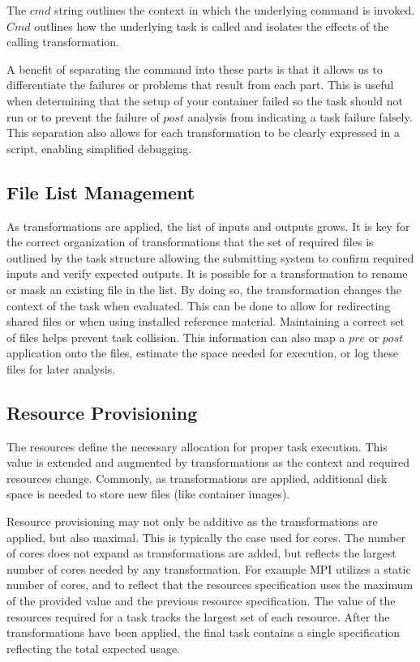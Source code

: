 \documentclass[conference]{IEEEtran}
\begin{document}
The ${cmd}$ string outlines the context in which
the underlying command is invoked.
${Cmd}$ outlines how the underlying task is called
and isolates the effects of the calling transformation.

A benefit of separating the command into these parts
is that it allows us to differentiate the failures or 
problems that result from each part.
This is useful when determining that the setup of 
your container failed so the task should not run 
or to prevent the failure of $post$ analysis from 
indicating a task failure falsely.
This separation also allows for each transformation
to be clearly expressed in a script, 
enabling simplified debugging.



\subsection{File List Management}

As transformations are applied, the list of inputs and outputs grows. 
It is key for the correct organization of transformations that the 
set of required files is outlined by the task structure
allowing the submitting system to confirm required inputs
and verify expected outputs.
It is possible for a transformation to rename or mask an existing 
file in the list.
By doing so, the transformation changes the 
context of the task when evaluated.
This can be done to allow for redirecting shared files or when using
installed reference material.
Maintaining a correct set of files helps
prevent task collision.
This information can also map a
$pre$ or $post$ application onto the files, 
estimate the space needed for execution,
or log these files for later analysis.


\subsection{Resource Provisioning}

The resources define the necessary allocation for proper task execution. 
This value is extended and augmented by transformations 
as the context and required resources change.
Commonly, as transformations are applied, 
additional disk space is needed to store new files
(like container images). 

Resource provisioning may not only be additive 
as the transformations are applied,
but also maximal.
This is typically the case used for cores.
The number of cores does not expand as
transformations are added, but reflects
the largest number of cores needed by any
transformation.
For example MPI utilizes a static number of cores, 
and to reflect that the resources specification
uses the maximum of the provided value and the previous
resource specification. 
The value of the resources required for a task 
tracks the largest set of each resource.
After the transformations have been applied, 
the final task contains a single specification 
reflecting the total expected usage.
\end{document}
